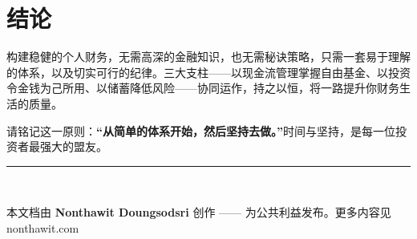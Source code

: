 \documentclass[11pt,a4paper,twocolumn]{article}
\begin{document}
\section{结论}
构建稳健的个人财务，无需高深的金融知识，也无需秘诀策略，只需一套易于理解的体系，以及切实可行的纪律。三大支柱——以现金流管理掌握自由基金、以投资令金钱为己所用、以储蓄降低风险——协同运作，持之以恒，将一路提升你财务生活的质量。

请铭记这一原则：\textbf{“从简单的体系开始，然后坚持去做。”}时间与坚持，是每一位投资者最强大的盟友。

\vspace{1em}
\noindent\rule{\linewidth}{0.4pt}\\
{\small\raggedright 本文档由 \textbf{Nonthawit Doungsodsri} 创作 —— 为公共利益发布。更多内容见 nonthawit.com\par}
\end{document}
